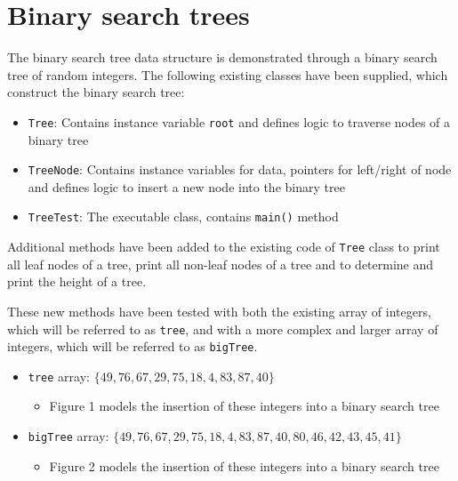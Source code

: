 \newpage
\section{Binary search trees}

The binary search tree data structure is demonstrated through a binary search tree of random integers. The following existing classes have been supplied, which construct the binary search tree:

\begin{itemize}
\item \texttt{Tree}: Contains instance variable \texttt{root} and defines logic to traverse nodes of a binary tree
\item \texttt{TreeNode}: Contains instance variables for data, pointers for left/right of node and defines logic to insert a new node into the binary tree
\item \texttt{TreeTest}: The executable class, contains \texttt{main()} method
\end{itemize}

Additional methods have been added to the existing code of \texttt{Tree} class to print all leaf nodes of a tree, print all non-leaf nodes of a tree and to determine and print the height of a tree.

These new methods have been tested with both the existing array of integers, which will be referred to as \texttt{tree}, and with a more complex and larger array of integers, which will be referred to as \texttt{bigTree}.

\begin{itemize}
\item \texttt{tree} array: $\{49, 76, 67, 29, 75, 18, 4, 83, 87, 40\}$
	\begin{itemize}
	\item Figure 1 models the insertion of these integers into a binary search tree
	\end{itemize}
\item \texttt{bigTree} array: $\{49, 76, 67, 29, 75, 18, 4, 83, 87, 40, 80, 46, 42, 43, 45, 41\}$
	\begin{itemize}
	\item Figure 2 models the insertion of these integers into a binary search tree
	\end{itemize}
\end{itemize}

\newpage




